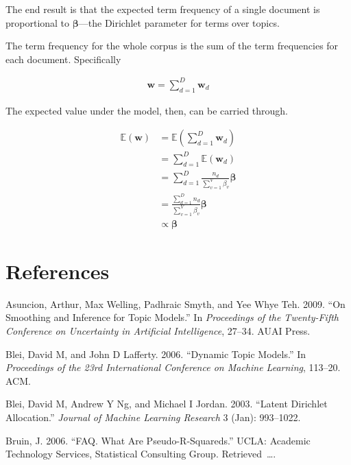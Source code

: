 \documentclass[conference,final,]{IEEEtran}
\begin{document}
The end result is that the expected term frequency of a single document
is proportional to \(\boldsymbol\beta\)---the Dirichlet parameter for
terms over topics.

The term frequency for the whole corpus is the sum of the term
frequencies for each document. Specifically

\begin{align*}
  \mathbf{w} = \sum_{d=1}^D\mathbf{w}_d
\end{align*}

The expected value under the model, then, can be carried through.

\begin{align*}
  \mathbb{E}(\mathbf{w})
    &= \mathbb{E}\left(\sum_{d=1}^D\mathbf{w}_d\right) \\
    &= \sum_{d=1}^D\mathbb{E}(\mathbf{w}_d)\\
    &= \sum_{d=1}^D \frac{n_d}{\sum_{v=1}^V\beta_v}\boldsymbol\beta\\
    &= \frac{\sum_{d=1}^D n_d}{\sum_{v=1}^V\beta_v}\boldsymbol\beta\\
    &\propto \boldsymbol\beta
\end{align*}

\newpage

\hypertarget{references}{%
\section*{References}\label{references}}

\hypertarget{refs}{}
\leavevmode\hypertarget{ref-asuncion2009smoothing}{}%
Asuncion, Arthur, Max Welling, Padhraic Smyth, and Yee Whye Teh. 2009.
``On Smoothing and Inference for Topic Models.'' In \emph{Proceedings of
the Twenty-Fifth Conference on Uncertainty in Artificial Intelligence},
27--34. AUAI Press.

\leavevmode\hypertarget{ref-blei2006dynamic}{}%
Blei, David M, and John D Lafferty. 2006. ``Dynamic Topic Models.'' In
\emph{Proceedings of the 23rd International Conference on Machine
Learning}, 113--20. ACM.

\leavevmode\hypertarget{ref-blei2003latent}{}%
Blei, David M, Andrew Y Ng, and Michael I Jordan. 2003. ``Latent
Dirichlet Allocation.'' \emph{Journal of Machine Learning Research} 3
(Jan): 993--1022.

\leavevmode\hypertarget{ref-bruin2006faq}{}%
Bruin, J. 2006. ``FAQ. What Are Pseudo-R-Squareds.'' UCLA: Academic
Technology Services, Statistical Consulting Group. Retrieved~\ldots{}.
\end{document}
